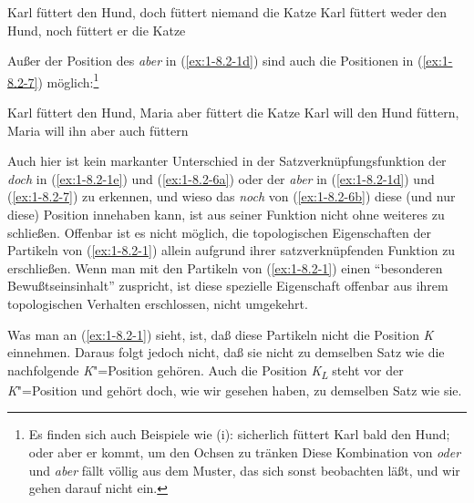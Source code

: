 \documentclass[output=paper]{langsci/langscibook}
\begin{document}
\begin{exe}
\ex\label{ex:1-8.2-6}
\begin{xlist}
\ex\label{ex:1-8.2-6a} Karl füttert den Hund, doch füttert niemand die Katze
\ex\label{ex:1-8.2-6b} Karl füttert weder den Hund, noch füttert er die Katze
\end{xlist}
\end{exe}
Außer der Position des \textit{aber} in (\ref{ex:1-8.2-1d}) sind auch die Positionen in
(\ref{ex:1-8.2-7}) möglich:\footnote{%
  Es finden sich auch Beispiele wie (i):
  \ea
  \label{ex:1-fn37i}
  sicherlich füttert Karl bald den Hund; oder aber er kommt, um den Ochsen zu tränken
  \z
  Diese Kombination von \textit{oder} und \textit{aber} fällt völlig aus dem Muster, das sich sonst beobachten
  läßt, und wir gehen darauf nicht ein.%
}
\begin{exe}
\ex\label{ex:1-8.2-7}
\begin{xlist}
\ex\label{ex:1-8.2-7a} Karl füttert den Hund, Maria aber füttert die Katze
\ex\label{ex:1-8.2-7b} Karl will den Hund füttern, Maria will ihn aber auch füttern
\end{xlist}
\end{exe}
Auch hier ist kein markanter Unterschied in der Satzverknüpfungsfunktion der
\textit{doch} in (\ref{ex:1-8.2-1e}) und (\ref{ex:1-8.2-6a}) oder der \textit{aber} in (\ref{ex:1-8.2-1d}) und (\ref{ex:1-8.2-7}) zu erkennen, und wieso das
\textit{noch} von (\ref{ex:1-8.2-6b}) diese (und nur diese) Position innehaben kann, ist aus seiner Funktion nicht ohne weiteres zu schließen. Offenbar ist es nicht möglich, die topologischen Eigenschaften der Partikeln von (\ref{ex:1-8.2-1}) allein aufgrund ihrer satzverknüpfenden
Funktion zu erschließen. Wenn man mit \citet[36]{Drach1937} den Partikeln von (\ref{ex:1-8.2-1}) einen
"`besonderen Bewußtseinsinhalt"' zuspricht, ist diese spezielle Eigenschaft offenbar
aus ihrem topologischen Verhalten erschlossen, nicht umgekehrt.

Was man an (\ref{ex:1-8.2-1}) sieht, ist, daß diese Partikeln nicht die Position \textit{K} einnehmen. Daraus folgt jedoch nicht, daß sie nicht zu demselben Satz wie die nachfolgende \textit{K}"=Position gehören. Auch die Position \textit{K\textsubscript{L}} steht vor der \textit{K}"=Position und gehört doch, wie
wir gesehen haben, zu demselben Satz wie sie.
\end{document}
